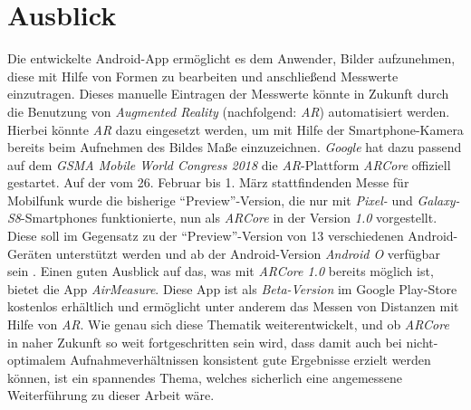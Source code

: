 \section{Ausblick}
Die entwickelte Android-App ermöglicht es dem Anwender, Bilder aufzunehmen, diese mit Hilfe von Formen zu bearbeiten und anschließend Messwerte einzutragen.
Dieses manuelle Eintragen der Messwerte könnte in Zukunft durch die Benutzung von \emph{Augmented Reality} (nachfolgend: \emph{AR}) automatisiert werden.
Hierbei könnte \emph{AR} dazu eingesetzt werden, um mit Hilfe der Smartphone-Kamera bereits beim Aufnehmen des Bildes Maße einzuzeichnen.
\emph{Google} hat dazu passend auf dem \emph{GSMA Mobile World Congress 2018} die \emph{AR}-Plattform \emph{ARCore} offiziell gestartet.
Auf der vom 26. Februar bis 1. März stattfindenden Messe für Mobilfunk wurde die bisherige ``Preview''-Version, die nur mit \emph{Pixel-} und \emph{Galaxy-S8}-Smartphones funktionierte, nun als \emph{ARCore} in der Version \emph{1.0} vorgestellt.
Diese soll im Gegensatz zu der ``Preview''-Version von 13 verschiedenen Android-Geräten unterstützt werden und ab der Android-Version \emph{Android O} verfügbar sein \citep{heise18}.
Einen guten Ausblick auf das, was mit \emph{ARCore 1.0} bereits möglich ist, bietet die App \emph{AirMeasure}. 
Diese App ist als \emph{Beta-Version} im Google Play-Store kostenlos erhältlich und ermöglicht unter anderem das Messen von Distanzen mit Hilfe von \emph{AR}.
Wie genau sich diese Thematik weiterentwickelt, und ob \emph{ARCore} in naher Zukunft so weit fortgeschritten sein wird, dass damit auch bei nicht-optimalem Aufnahmeverhältnissen konsistent gute Ergebnisse erzielt werden können, ist ein spannendes Thema, welches sicherlich eine angemessene Weiterführung zu dieser Arbeit wäre.

